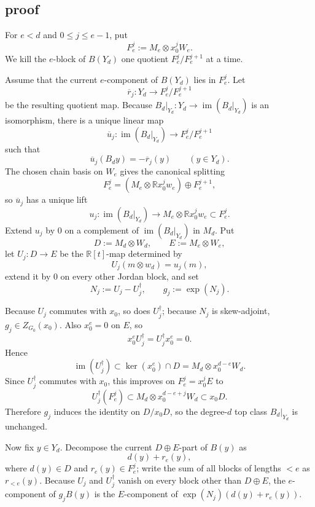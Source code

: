 \documentclass[
]{article}
\begin{document}
\subsection{proof}\label{proof-12}

For \(e<d\) and \(0\le j\le e-1\), put \[
F_e^j:=M_e\otimes x_0^jW_e.
\] We kill the \(e\)-block of \(B(Y_d)\) one quotient
\(F_e^j/F_e^{j+1}\) at a time.

Assume that the current \(e\)-component of \(B(Y_d)\) lies in \(F_e^j\).
Let \[
\overline r_j:Y_d\longrightarrow F_e^j/F_e^{j+1}
\] be the resulting quotient map. Because
\(B_d|_{Y_d}:Y_d\to \operatorname{im}(B_d|_{Y_d})\) is an isomorphism,
there is a unique linear map \[
\overline u_j:\operatorname{im}(B_d|_{Y_d})\longrightarrow F_e^j/F_e^{j+1}
\] such that \[
\overline u_j(B_dy)=-\overline r_j(y)\qquad (y\in Y_d).
\] The chosen chain basis on \(W_e\) gives the canonical splitting \[
F_e^j=(M_e\otimes \mathbb R x_0^jw_e)\oplus F_e^{j+1},
\] so \(\overline u_j\) has a unique lift \[
u_j:\operatorname{im}(B_d|_{Y_d})\longrightarrow M_e\otimes \mathbb R x_0^jw_e\subset F_e^j.
\] Extend \(u_j\) by \(0\) on a complement of
\(\operatorname{im}(B_d|_{Y_d})\) in \(M_d\). Put \[
D:=M_d\otimes W_d,\qquad E:=M_e\otimes W_e,
\] let \(U_j:D\to E\) be the \(\mathbb R[t]\)-map determined by \[
U_j(m\otimes w_d)=u_j(m),
\] extend it by \(0\) on every other Jordan block, and set \[
N_j:=U_j-U_j^\dagger,\qquad g_j:=\exp(N_j).
\]

Because \(U_j\) commutes with \(x_0\), so does \(U_j^\dagger\); because
\(N_j\) is skew-adjoint, \(g_j\in Z_{G_0}(x_0)\). Also \(x_0^e=0\) on
\(E\), so \[
x_0^eU_j^\dagger=U_j^\dagger x_0^e=0.
\] Hence \[
\operatorname{im}(U_j^\dagger)\subset \ker(x_0^e)\cap D=M_d\otimes x_0^{d-e}W_d.
\] Since \(U_j^\dagger\) commutes with \(x_0\), this improves on
\(F_e^j=x_0^jE\) to \[
U_j^\dagger(F_e^j)\subset M_d\otimes x_0^{d-e+j}W_d\subset x_0D.
\] Therefore \(g_j\) induces the identity on \(D/x_0D\), so the
degree-\(d\) top class \(B_d|_{Y_d}\) is unchanged.

Now fix \(y\in Y_d\). Decompose the current \(D\oplus E\)-part of
\(B(y)\) as \[
d(y)+r_e(y),
\] where \(d(y)\in D\) and \(r_e(y)\in F_e^j\); write the sum of all
blocks of lengths \(<e\) as \(r_{<e}(y)\). Because \(U_j\) and
\(U_j^\dagger\) vanish on every block other than \(D\oplus E\), the
\(e\)-component of \(g_jB(y)\) is the \(E\)-component of
\(\exp(N_j)(d(y)+r_e(y))\).
\end{document}
